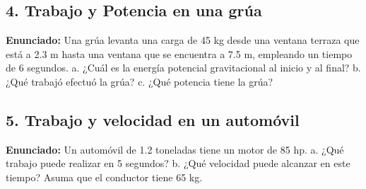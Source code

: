 \documentclass[12pt, letterpaper]{article}
\begin{document}
	\subsection*{4. Trabajo y Potencia en una grúa}
	\noindent \textbf{Enunciado:} Una grúa levanta una carga de 45 kg desde una ventana terraza que está a 2.3 m hasta una ventana que se encuentra a 7.5 m, empleando un tiempo de 6 segundos. a. ¿Cuál es la energía potencial gravitacional al inicio y al final? b. ¿Qué trabajó efectuó la grúa? c. ¿Qué potencia tiene la grúa?
	
	
	\subsection*{5. Trabajo y velocidad en un automóvil}
	\noindent \textbf{Enunciado:} Un automóvil de 1.2 toneladas tiene un motor de 85 hp. a. ¿Qué trabajo puede realizar en 5 segundos? b. ¿Qué velocidad puede alcanzar en este tiempo? Asuma que el conductor tiene 65 kg.
	
\end{document}
